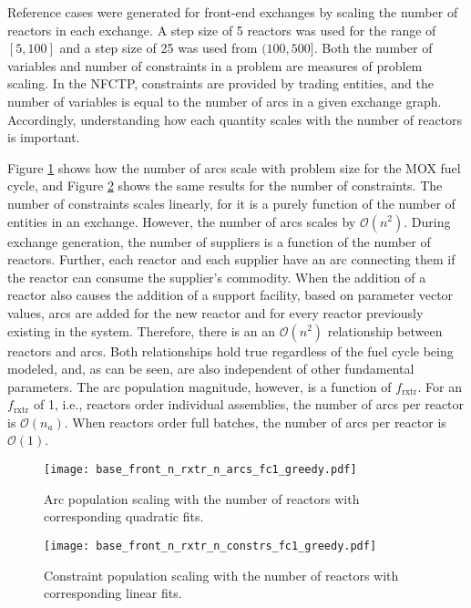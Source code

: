 Reference cases were generated for front-end exchanges by scaling the number of
reactors in each exchange. A step size of 5 reactors was used for the range of
$[5, 100]$ and a step size of 25 was used from $(100, 500]$. Both the number of
  variables and number of constraints in a problem are measures of problem
  scaling. In the NFCTP, constraints are provided by trading entities, and the
  number of variables is equal to the number of arcs in a given exchange
  graph. Accordingly, understanding how each quantity scales with the number of
  reactors is important.

Figure \ref{fig:base_front_n_rxtr_n_arcs_fc1_greedy} shows how the number of
arcs scale with problem size for the MOX fuel cycle, and Figure
\ref{fig:base_front_n_rxtr_n_constrs_fc1_greedy} shows the same results for the
number of constraints. The number of constraints scales linearly, for it is a
purely function of the number of entities in an exchange. However, the number of
arcs scales by $\mathcal{O}(n^2)$. During exchange generation, the number of
suppliers is a function of the number of reactors. Further, each reactor and
each supplier have an arc connecting them if the reactor can consume the
supplier's commodity. When the addition of a reactor also causes the addition of
a support facility, based on parameter vector values, arcs are added for the new
reactor and for every reactor previously existing in the system. Therefore,
there is an an $\mathcal{O}(n^2)$ relationship between reactors and arcs. Both
relationships hold true regardless of the fuel cycle being modeled, and, as can
be seen, are also independent of other fundamental parameters. The arc
population magnitude, however, is a function of $f_\text{rxtr}$. For an
$f_\text{rxtr}$ of 1, i.e., reactors order individual assemblies, the number of
arcs per reactor is $\mathcal{O}(n_a)$. When reactors order full batches, the
number of arcs per reactor is $\mathcal{O}(1)$.

\begin{figure}[h!]
  \begin{center}
    \texttt{[image: base\_front\_n\_rxtr\_n\_arcs\_fc1\_greedy.pdf]}
    \caption{
      \label{fig:base_front_n_rxtr_n_arcs_fc1_greedy}
      Arc population scaling with the number of reactors with corresponding
      quadratic fits.}
  \end{center}
\end{figure}

\begin{figure}[h!]
  \begin{center}
    \texttt{[image: base\_front\_n\_rxtr\_n\_constrs\_fc1\_greedy.pdf]}
    \caption{
      \label{fig:base_front_n_rxtr_n_constrs_fc1_greedy}
      Constraint population scaling with the number of reactors with
      corresponding linear fits.}
  \end{center}
\end{figure}

